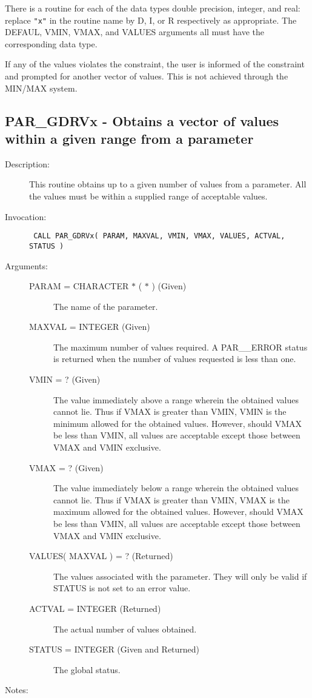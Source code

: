 \documentclass[twoside,11pt]{article}
\newcommand{\xlabel}[1]{}
\newlength{\sstbannerlength}
\newlength{\sstcaptionlength}
\newlength{\sstexampleslength}
\newlength{\sstexampleswidth}
\newcommand{\sstroutine}[3]{
   \goodbreak
   \rule{\textwidth}{0.5mm}
   \vspace{-7ex}
   \newline
   \settowidth{\sstbannerlength}{{\Large {\bf #1}}}
   \setlength{\sstcaptionlength}{\textwidth}
   \setlength{\sstexampleslength}{\textwidth}
   \addtolength{\sstbannerlength}{0.5em}
   \addtolength{\sstcaptionlength}{-2.0\sstbannerlength}
   \addtolength{\sstcaptionlength}{-5.0pt}
   \settowidth{\sstexampleswidth}{{\bf Examples:}}
   \addtolength{\sstexampleslength}{-\sstexampleswidth}
   \parbox[t]{\sstbannerlength}{\flushleft{\Large {\bf #1}}}
   \parbox[t]{\sstcaptionlength}{\center{\Large #2}}
   \parbox[t]{\sstbannerlength}{\flushright{\Large {\bf #1}}}
   \begin{description}
      #3
   \end{description}
}
\newcommand{\sstdescription}[1]{\item[Description:] #1}
\newcommand{\sstinvocation}[1]{\item[Invocation:]\hspace{0.4em}{\tt #1}}
\newcommand{\sstarguments}[1]{
   \item[Arguments:] \mbox{} \\
   \vspace{-3.5ex}
   \begin{description}
      #1
   \end{description}
}
\newcommand{\sstsubsection}[1]{ \item[{#1}] \mbox{} \\}
\newcommand{\sstnotes}[1]{\item[Notes:] \mbox{} \\[1.3ex] #1}
\newcommand{\sstitemlist}[1]{
  \mbox{} \\
  \vspace{-7ex}
  \begin{itemize}
     #1
  \end{itemize}
}
\newcommand{\sstitem}{\item}
\newcommand{\ssttt}{\tt}
\renewcommand{\sstroutine}[3]{
      \subsection{\xlabel{12}#1\xlabel{#1}-\label{#1}#2}
      \begin{description}
         #3
      \end{description}
   }
\renewcommand{\sstdescription}[1]{\item[Description:]
      \begin{description}
         #1
      \end{description}
   }
\renewcommand{\sstinvocation}[1]{\item[Invocation:]
      \begin{description}
         {\ssttt #1}
      \end{description}
   }
\renewcommand{\sstarguments}[1]{
      \item[Arguments:]
      \begin{description}
         #1
      \end{description}
   }
\renewcommand{\sstsubsection}[1]{\item[{#1}]}
\renewcommand{\sstnotes}[1]{\item[Notes:]
      \begin{description}
         #1
      \end{description}
   }
\newcommand{\sstitemlist}[1]{
      \begin{itemize}
         #1
      \end{itemize}
   }
\begin{document}
{{{         \sstitem
         There is a routine for each of the data types double precision,
         integer, and real: replace {\tt "x"} in the routine name by
         D, I, or R respectively as appropriate.  The DEFAUL, VMIN, VMAX,
         and VALUES arguments all must have the corresponding data type.

         \sstitem
         If any of the values violates the constraint, the user is
         informed of the constraint and prompted for another vector of
         values.  This is not achieved through the MIN/MAX system.
      }
   }
}

\sstroutine{
   PAR\_GDRVx
}{
   Obtains a vector of values within a given range from a parameter
}{
   \sstdescription{
      This routine obtains up to a given number of values from a
      parameter.  All the values must be within a supplied range of
      acceptable values.
   }
   \sstinvocation{
      CALL PAR\_GDRVx( PARAM, MAXVAL, VMIN, VMAX, VALUES, ACTVAL,
                      STATUS )
   }
   \sstarguments{
      \sstsubsection{
         PARAM = CHARACTER $*$ ( $*$ ) (Given)
      }{
         The name of the parameter.
      }
      \sstsubsection{
         MAXVAL = INTEGER (Given)
      }{
         The maximum number of values required.  A PAR\_\_ERROR status is
         returned when the number of values requested is less than one.
      }
      \sstsubsection{
         VMIN = ? (Given)
      }{
         The value immediately above a range wherein the obtained
         values cannot lie.  Thus if VMAX is greater than VMIN, VMIN
         is the minimum allowed for the obtained values.  However,
         should VMAX be less than VMIN, all values are acceptable
         except those between VMAX and VMIN exclusive.
      }
      \sstsubsection{
         VMAX = ? (Given)
      }{
         The value immediately below a range wherein the obtained
         values cannot lie.  Thus if VMAX is greater than VMIN, VMAX
         is the maximum allowed for the obtained values.  However,
         should VMAX be less than VMIN, all values are acceptable
         except those between VMAX and VMIN exclusive.
      }
      \sstsubsection{
         VALUES( MAXVAL ) = ? (Returned)
      }{
         The values associated with the parameter.  They will only be
         valid if STATUS is not set to an error value.
      }
      \sstsubsection{
         ACTVAL = INTEGER (Returned)
      }{
         The actual number of values obtained.
      }
      \sstsubsection{
         STATUS = INTEGER (Given and Returned)
      }{
         The global status.
      }
   }
   \sstnotes{
      \sstitemlist{

}}}
\end{document}
